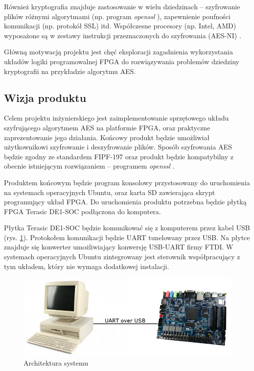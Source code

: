 Również kryptografia znajduje zastosowanie w wielu dziedzinach -- szyfrowanie plików różnymi algorytmami (np. program \textit{openssl} \cite{openssl}), zapewnienie poufności komunikacji (np. protokół SSL) itd. Współczesne procesory (np. Intel, AMD) wyposażone są w zestawy instrukcji przeznaczonych do szyfrowania (AES-NI) \cite{aes-processors}. 

Główną motywacją projektu jest chęć eksploracji zagadnienia wykorzystania układów logiki programowalnej FPGA do rozwiązywania problemów dziedziny kryptografii na przykładzie algorytmu AES.

\subsection{Wizja produktu}
Celem projektu inżynierskiego jest zaimplementowanie sprzętowego układu szyfrującego algorytmem AES na platformie FPGA, oraz praktyczne zaprezentowanie jego działania. Końcowy produkt będzie umożliwiał użytkownikowi szyfrowanie i deszyfrowanie plików. Sposób szyfrowania AES będzie zgodny ze standardem FIPF-197 \cite{aes-standard} oraz produkt będzie kompatybilny z obecnie istniejącym rozwiązaniem -- programem \textit{openssl} \cite{openssl}.

Produktem końcowym będzie program konsolowy przystosowany do uruchomienia na systemach operacyjnych Ubuntu, oraz karta SD zawierająca skrypt programujący układ FPGA. Do uruchomienia produktu potrzebna będzie płytką FPGA Terasic DE1-SOC podłączona do komputera.

Płytka Terasic DE1-SOC będzie komunikować się z komputerem przez kabel USB (rys. \ref{fig:system-architecture-basic}). Protokołem komunikacji będzie UART tunelowany przez USB. Na płytce znajduje się konwerter umożliwiający konwersję USB-UART firmy FTDI. W systemach operacyjnych Ubuntu zintegrowany jest sterownik współpracujący z tym układem, który nie wymaga dodatkowej instalacji.

\begin{figure}[!h]
\centering
\includegraphics[width=6in]{pictures/system-architecture-basic.png}
\caption{Architektura systemu}
\label{fig:system-architecture-basic}
\end{figure}

